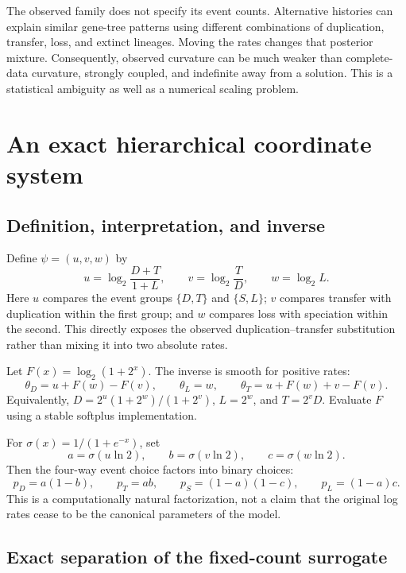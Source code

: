 \documentclass[11pt]{article}
\begin{document}
The observed family does not specify its event counts. Alternative histories can
explain similar gene-tree patterns using different combinations of duplication,
transfer, loss, and extinct lineages. Moving the rates changes that posterior
mixture. Consequently, observed curvature can be much weaker than complete-data
curvature, strongly coupled, and indefinite away from a solution. This is a
statistical ambiguity as well as a numerical scaling problem.

\section{An exact hierarchical coordinate system}

\subsection{Definition, interpretation, and inverse}

Define $\psi=(u,v,w)$ by
\begin{equation}
 \boxed{\quad
 u=\log_2\frac{D+T}{1+L},\qquad
 v=\log_2\frac{T}{D},\qquad
 w=\log_2 L.
 \quad}
 \label{eq:hierarchy}
\end{equation}
Here $u$ compares the event groups $\{D,T\}$ and $\{S,L\}$; $v$ compares
transfer with duplication within the first group; and $w$ compares loss with
speciation within the second. This directly exposes the observed
duplication--transfer substitution rather than mixing it into two absolute rates.

Let $F(x)=\log_2(1+2^x)$. The inverse is smooth for positive rates:
\begin{equation}
 \theta_D=u+F(w)-F(v),\qquad
 \theta_L=w,\qquad
 \theta_T=u+F(w)+v-F(v).
 \label{eq:inverse}
\end{equation}
Equivalently, $D=2^u(1+2^w)/(1+2^v)$, $L=2^w$, and $T=2^vD$.
Evaluate $F$ using a stable softplus implementation.

For $\sigma(x)=1/(1+e^{-x})$, set
\[
 a=\sigma(u\ln 2),\qquad b=\sigma(v\ln 2),\qquad
 c=\sigma(w\ln 2).
\]
Then the four-way event choice factors into binary choices:
\begin{equation}
 p_D=a(1-b),\qquad p_T=ab,\qquad
 p_S=(1-a)(1-c),\qquad p_L=(1-a)c.
 \label{eq:binary-factorization}
\end{equation}
This is a computationally natural factorization, not a claim that the original
log rates cease to be the canonical parameters of the model.

\subsection{Exact separation of the fixed-count surrogate}
\end{document}

